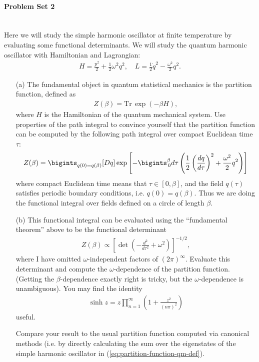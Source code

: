 \paragraph*{Problem Set 2} %
\\
Here we will study the simple harmonic oscillator at finite temperature by evaluating some functional determinants. We will study the quantum harmonic oscillator with Hamiltonian and Lagrangian:
\begin{align}
    H = \frac{p^2}{2} + \frac{1}{2} \omega^2 q^2, \quad L = \frac{1}{2} \dot{q}^2 - \frac{\omega^2}{2} q^2.
\end{align}
\begin{enumerate}
    \item [(a)] The fundamental object in quantum statistical mechanics is the partition function, defined as
\begin{align}
    Z(\beta) = \text{Tr} \, \exp(-\beta H), \label{eq:partition-function-qm-def}
\end{align}
where $H$ is the Hamiltonian of the quantum mechanical system. Use properties of the path integral to convince yourself that the partition function can be computed by the following path integral over compact Euclidean time $\tau$:
\begin{align}
    Z(\beta) = \bigints_{q(0)=q(\beta)} [Dq] \exp \left[ -\bigints_{\,0}^{\beta} d\tau \left( \frac{1}{2} \left( \frac{dq}{d\tau} \right)^2 + \frac{\omega^2}{2} q^2 \right) \right]
\end{align}
where compact Euclidean time means that $\tau \in [0, \beta]$, and the field $q(\tau)$ satisfies periodic boundary conditions, i.e. $q(0) = q(\beta)$. Thus we are doing the functional integral over fields defined on a circle of length $\beta$.
\item [(b)] This functional integral can be evaluated using the “fundamental theorem” above to be the functional determinant
\begin{align}
    Z(\beta) \propto \left[ \det \left( -\frac{d^2}{d\tau^2} + \omega^2 \right) \right]^{-1/2},
\end{align}
where I have omitted $\omega$-independent factors of $(2\pi)^\infty$. Evaluate this determinant and compute the $\omega$-dependence of the partition function. (Getting the $\beta$-dependence exactly right is tricky, but the $\omega$-dependence is unambiguous). You may find the identity
\begin{align}
    \sinh z = z \prod_{n=1}^{\infty} \left( 1 + \frac{z^2}{(n\pi)^2} \right)
\end{align}
useful.

Compare your result to the usual partition function computed via canonical methods (i.e. by directly calculating the sum over the eigenstates of the simple harmonic oscillator in (\ref{eq:partition-function-qm-def}).
\end{enumerate}
\bigskip\bigskip\hline\hline\bigskip
